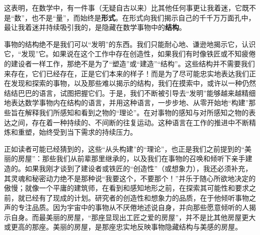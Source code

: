 这表明，在数学中，有一件事（无疑自古以来）比其他任何事更让我着迷，它既不是“数”，也不是“量”，而始终是\textbf{形式}。在形式向我们揭示自己的千千万万面孔中，最让我着迷并持续吸引我的，是隐藏在数学事物中的\textbf{结构}。

事物的结构绝不是我们可以“发明”的东西。我们只能耐心地、谦逊地揭示它，认识它，“发现”它。如果说在这个工作中存在创造性，如果我们有时像铁匠或不知疲倦的建设者一样工作，那绝不是为了“塑造”或“建造”“结构”。这些结构并不需要我们来存在，它们已经存在，正是它们本来的样子！而是为了尽可能忠实地表达我们正在发现和探索的事物，以及那些难以揭示的结构，我们在摸索中，或许以一种仍然结结巴巴的语言，试图把握它们。于是，我们不断被引导去“发明”能够越来越精细地表达数学事物内在结构的语言，并用这种语言，一步步地、从零开始地“构建”那些旨在解释我们所感知和看到之物的“理论”。在对事物的感知与对所感知之物的表达之间，存在着一种持续的、不间断的往复运动。这种语言在工作的推进中不断精炼和重塑，始终受到当下需求的持续压力。

正如读者可能已经猜到的，这些“从头构建”的“理论”，也正是我们之前提到的“美丽的房屋”：那些我们从前辈那里继承的，以及我们在事物的召唤和倾听下亲手建造的。如果我刚才谈到了建设者或铁匠的“创造性”（或想象力），我还必须补充，其灵魂和秘密动力绝不是那种说“我要这个，不要那个！”并乐于随心所欲地决定的傲慢；就像一个平庸的建筑师，在看到和感知地形之前，在探索其可能性和要求之前，就已经有了现成的计划。研究者的创造性和想象力的品质，在于他倾听事物之声的专注品质。因为宇宙中的事物从不厌倦地述说自身，并向那些愿意倾听的人揭示自身。而最美丽的房屋，“那座显现出工匠之爱的房屋”，并不是比其他房屋更大或更高的那座。美丽的房屋，是那座忠实地反映事物隐藏结构与美感的房屋。
